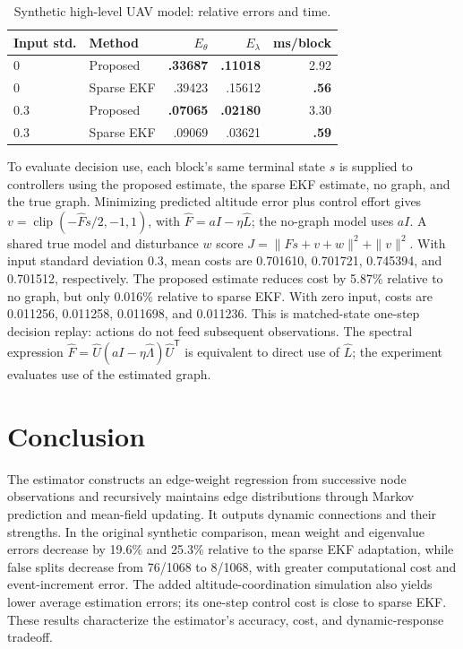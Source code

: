 \documentclass[journal]{IEEEtran}
\newcommand{\T}{\mathsf T}
\begin{document}
\begin{table}[t]\centering\scriptsize
\caption{Synthetic high-level UAV model: relative errors and time.}\label{tab:uav}
\setlength{\tabcolsep}{4pt}\begin{tabular}{llrrr}\toprule
Input std. & Method & $E_\theta$ & $E_\lambda$ & ms/block\\\midrule
0 & Proposed & \textbf{.33687} & \textbf{.11018} & 2.92\\
0 & Sparse EKF & .39423 & .15612 & \textbf{.56}\\
0.3 & Proposed & \textbf{.07065} & \textbf{.02180} & 3.30\\
0.3 & Sparse EKF & .09069 & .03621 & \textbf{.59}\\\bottomrule
\end{tabular}\end{table}

To evaluate decision use, each block's same terminal state $s$ is supplied to controllers using the proposed estimate, the sparse EKF estimate, no graph, and the true graph. Minimizing predicted altitude error plus control effort gives $v=\operatorname{clip}(-\hat F s/2,-1,1)$, with $\hat F=aI-\eta\hat L$; the no-graph model uses $aI$. A shared true model and disturbance $w$ score $J=\|Fs+v+w\|^2+\|v\|^2$. With input standard deviation 0.3, mean costs are 0.701610, 0.701721, 0.745394, and 0.701512, respectively. The proposed estimate reduces cost by 5.87\% relative to no graph, but only 0.016\% relative to sparse EKF. With zero input, costs are 0.011256, 0.011258, 0.011698, and 0.011236. This is matched-state one-step decision replay: actions do not feed subsequent observations. The spectral expression $\hat F=\hat U(aI-\eta\hat\Lambda)\hat U^\T$ is equivalent to direct use of $\hat L$; the experiment evaluates use of the estimated graph.

\section{Conclusion}
The estimator constructs an edge-weight regression from successive node observations and recursively maintains edge distributions through Markov prediction and mean-field updating. It outputs dynamic connections and their strengths. In the original synthetic comparison, mean weight and eigenvalue errors decrease by 19.6\% and 25.3\% relative to the sparse EKF adaptation, while false splits decrease from 76/1068 to 8/1068, with greater computational cost and event-increment error. The added altitude-coordination simulation also yields lower average estimation errors; its one-step control cost is close to sparse EKF. These results characterize the estimator's accuracy, cost, and dynamic-response tradeoff.
\end{document}
